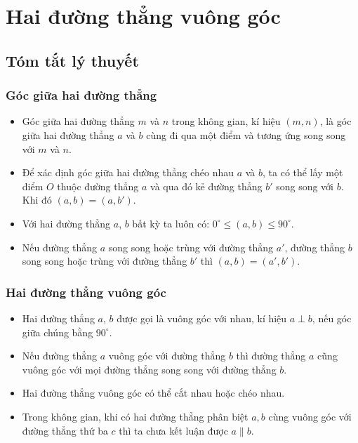 \setcounter{chapter}{6}%
\setcounter{dang}{0}
\setcounter{section}{21}
\section{Hai đường thẳng vuông góc}
\subsection{Tóm tắt lý thuyết}
\begin{tomtat}
	\subsubsection{Góc giữa hai đường thẳng} 
	\begin{itemize}
		\item Góc giữa hai đường thẳng $m$ và $n$ trong không gian, kí hiệu $(m,n)$, là góc giữa hai đường thẳng $a$ và $b$ cùng đi qua một điểm và tương ứng song song với $m$ và $n$.
		\item Để xác định góc giữa hai đường thẳng chéo nhau $a$ và $b$, ta có thể lấy một điểm $O$ thuộc đường thẳng $a$ và qua đó kẻ đường thẳng $b'$ song song với $b$. Khi đó $(a,b)=(a,b')$.
		\item Với hai đường thẳng $a$, $b$ bất kỳ ta luôn có:  $0^\circ \le (a,b) \le 90^\circ$.
		\item Nếu đường thẳng $a$ song song hoặc trùng với đường thẳng $a'$, đường thẳng $b$ song song hoặc trùng với đường thẳng $b'$ thì $(a,b)=(a',b')$.
	\end{itemize}
	\subsubsection{Hai đường thẳng vuông góc} 
	\begin{itemize}
		\item Hai đường thẳng $a$, $b$ được gọi là vuông góc với nhau, kí hiệu $a \perp b$, nếu góc giữa chúng bằng $90^ \circ$.
		\item Nếu đường thẳng $a$ vuông góc với đường thẳng $b$ thì đường thẳng $a$ cũng vuông góc với mọi đường thẳng song song với đường thẳng $b$.
		\item Hai đường thẳng vuông góc có thể cắt nhau hoặc chéo nhau.
		\item Trong không gian, khi có hai đường thẳng phân biệt $a,b$ cùng vuông góc với đường thẳng thứ ba $c$ thì ta chưa kết luận được $a \parallel b$.
	\end{itemize}
\end{tomtat}

